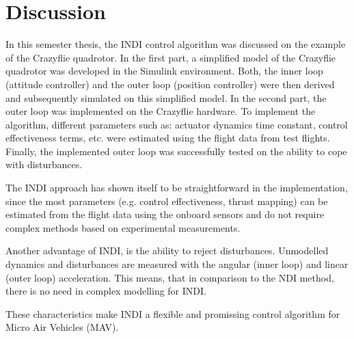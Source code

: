 \documentclass[11pt, a4paper, twoside]{report}
\begin{document}


\chapter{Discussion} \label{cha:discussion}

In this semester thesis, the \acrfull{INDI} control algorithm was discussed on the example of the Crazyflie quadrotor. In the first part, a simplified model of the Crazyflie quadrotor was developed in the Simulink environment. Both, the inner loop (attitude controller) and the outer loop (position controller) were then derived and subsequently simulated on this simplified model. In the second part, the outer loop was implemented on the Crazyflie hardware. To implement the algorithm, different parameters such as: actuator dynamics time constant, control effectiveness terms, etc. were estimated using the flight data from test flights. Finally, the implemented outer loop was successfully tested on the ability to cope with disturbances. 

The \acrshort{INDI} approach has shown itself to be straightforward in the implementation, since the most parameters (e.g. control effectiveness, thrust mapping) can be estimated from the flight data using the onboard sensors and do not require complex methods based on experimental measurements. 

Another advantage of \acrshort{INDI}, is the ability to reject disturbances. Unmodelled dynamics and disturbances are measured with the angular (inner loop) and linear (outer loop) acceleration. This means, that in comparison to the \acrfull{NDI} method, there is no need in complex modelling for \acrshort{INDI}.

These characteristics make \acrshort{INDI} a flexible and promissing control algorithm for Micro Air Vehicles (MAV). 

\thispagestyle{fancy}

\newpage

\setcounter{page}{1}

\renewcommand\bibname{References}		%


\end{document}
